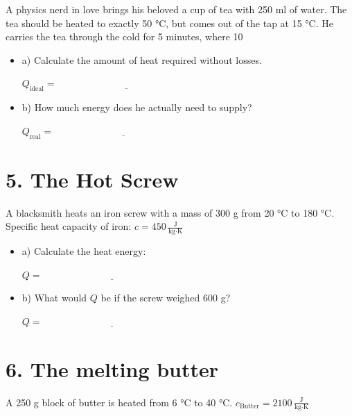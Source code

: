 \documentclass[a4paper]{article}
\begin{document}
	A physics nerd in love brings his beloved a cup of tea with 250 ml of water. The tea should be heated to exactly 50 °C, but comes out of the tap at 15 °C. He carries the tea through the cold for 5 minutes, where 10%
	
	\begin{itemize}
		\item a) Calculate the amount of heat required without losses.
		
		\vspace{1em}
		\( Q_\text{ideal} = \underline{\hspace{6cm}} \)
		
		\item b) How much energy does he actually need to supply?
		
		\vspace{1em}
		\( Q_\text{real} = \underline{\hspace{6cm}} \)
	\end{itemize}
	
	\section*{5. The Hot Screw}
	
	A blacksmith heats an iron screw with a mass of 300 g from 20 °C to 180 °C.
	Specific heat capacity of iron: \( c = 450\, \frac{\text{J}}{\text{kg}\cdot\text{K}} \)
	
	\begin{itemize}
		\item a) Calculate the heat energy:
		
		\vspace{1em}
		\( Q = \underline{\hspace{6cm}} \)
		
		\item b) What would \( Q \) be if the screw weighed 600 g?
		
		\vspace{1em}
		\( Q = \underline{\hspace{6cm}} \)
	\end{itemize}
	
	\hrulefill
	
	\section*{6. The melting butter }
	
	A 250 g block of butter is heated from 6 °C to 40 °C.
	\( c_\text{Butter} = 2100\, \frac{\text{J}}{\text{kg}\cdot\text{K}} \)
	
\end{document}
